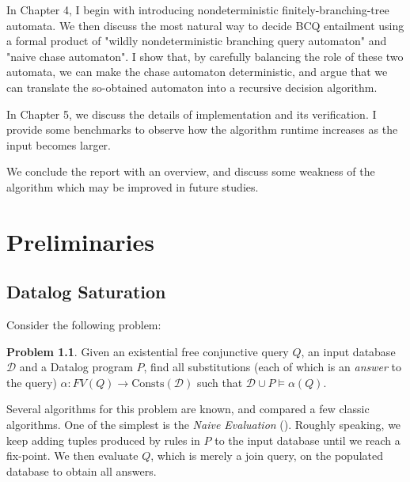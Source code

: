 \documentclass[12pt]{report}
\theoremstyle{plain}
\theoremstyle{definition}
\newtheorem{problem}[theorem]{Problem}
\def\Consts{{\mathrm{Consts}}}
\begin{document}
In Chapter 4, I begin with introducing nondeterministic finitely-branching-tree automata. We then discuss the most natural way to decide BCQ entailment using a formal product of "wildly nondeterministic branching query automaton" and "naive chase automaton". I show that, by carefully balancing the role of these two automata, we can make the chase automaton deterministic, and argue that we can translate the so-obtained automaton into a recursive decision algorithm.

In Chapter 5, we discuss the details of implementation and its verification. I provide some benchmarks to observe how the algorithm runtime increases as the input becomes larger.

We conclude the report with an overview, and discuss some weakness of the algorithm which may be improved in future studies.

\newpage
\chapter{Preliminaries}


\section{Datalog Saturation}

Consider the following problem:

\begin{problem}
   Given an existential free conjunctive query $Q$, an input database $\mathcal{D}$ and a Datalog program $P$, find all substitutions (each of which is an \emph{answer} to the query) $\alpha: FV(Q) \rightarrow \Consts(\mathcal{D})$ such that $\mathcal{D} \cup P \models \alpha(Q)$.
\end{problem}

Several algorithms for this problem are known, and \cite{bancilhon_ramakrishnan_1986} compared a few classic algorithms. One of the simplest is the \emph{Naive Evaluation} (). Roughly speaking, we keep adding tuples produced by rules in $P$ to the input database until we reach a fix-point. We then evaluate $Q$, which is merely a join query, on the populated database to obtain all answers.
\end{document}
